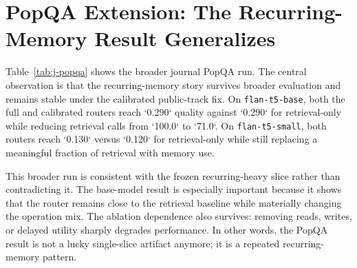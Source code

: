 \section{PopQA Extension: The Recurring-Memory Result Generalizes}

Table~\ref{tab:j-popqa} shows the broader journal PopQA run. The central observation is that the recurring-memory story survives broader evaluation and remains stable under the calibrated public-track fix. On \texttt{flan-t5-base}, both the full and calibrated routers reach `0.290` quality against `0.290` for retrieval-only while reducing retrieval calls from `100.0` to `71.0`. On \texttt{flan-t5-small}, both routers reach `0.130` versus `0.120` for retrieval-only while still replacing a meaningful fraction of retrieval with memory use.

\begin{table}[h]
\centering
\small

\caption{Broader seeded PopQA result from \texttt{artifacts/journal\_popqa\_broad\_100\_calibrated\_v1/aggregate\_table.md}.}
\label{tab:j-popqa}
\end{table}

This broader run is consistent with the frozen recurring-heavy slice rather than contradicting it. The base-model result is especially important because it shows that the router remains close to the retrieval baseline while materially changing the operation mix. The ablation dependence also survives: removing reads, writes, or delayed utility sharply degrades performance. In other words, the PopQA result is not a lucky single-slice artifact anymore; it is a repeated recurring-memory pattern.
